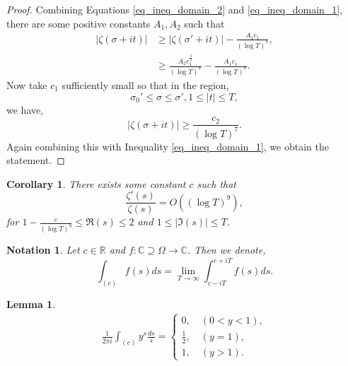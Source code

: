 \documentclass{article}
\newtheorem{lemma}{Lemma}[section]
\newtheorem{notation}{Notation}[section]
\newtheorem{corollary}{Corollary} [section]
\newcommand{\R}[0]{\mathbb{R}}
\newcommand{\C}[0]{\mathbb{C}}
\begin{document}
\begin{proof}
    Combining Equations \eqref{eq_ineq_domain_2} and \eqref{eq_ineq_domain_1}, there are some positive constants $A_1,A_2$ such that 
    \begin{align*}
      \vert\zeta(\sigma+it)\vert & \geq \vert\zeta(\sigma'+it)\vert-{\frac {A_1c_1} {(\log T)^7}},\\
      & \geq {\frac {A_2c_1^{{\frac 3 4}}} {(\log T)^7}}-{\frac {A_1c_1} {(\log T)^7}}.
    \end{align*}
    Now take $c_1$ sufficiently small so that in the region,
    \begin{equation*}
      \sigma_0'\leq \sigma\leq \sigma', 1\leq \vert t\vert \leq T,
    \end{equation*}
    we have,
    \begin{equation*}
      \vert\zeta(\sigma+it)\vert \geq {\frac {c_2} {(\log T)^7}}.
    \end{equation*}
    Again combining this with Inequality \eqref{eq_ineq_domain_1}, we obtain the statement.
  \end{proof}
  \begin{corollary}
    \label{corollary_bound_zeta_derivative}
    There exists some constant $c$ such that 
    \begin{equation*}
      {\frac {\zeta'(s)} {\zeta(s)}} = O((\log T)^9),
    \end{equation*}
    for $1-{\frac {c} {(\log T)^9}}\leq \Re(s)\leq 2$ and $1\leq \vert\Im(s)\vert\leq T$.
  \end{corollary}

  \begin{notation}
    Let $c\in\R$ and $f:\C\supseteq\Omega\to \C$. Then we denote,
    \begin{equation*}
      \int_{(c)}f(s)ds = \lim_{T\to\infty}\int_{c-iT}^{c+iT}f(s)ds.
    \end{equation*}
  \end{notation}

  \begin{lemma}
    \label{lemma_y_s_conv}
    \begin{align*}
      {\frac 1 {2\pi i}}\int_{(c)}y^s{\frac {ds} s} = \begin{cases}
        0,\quad(0<y<1),\\
        {\frac 1 2},\quad(y=1),\\
        1,\quad(y>1).
      \end{cases}
    \end{align*}
  \end{lemma}
\end{document}
